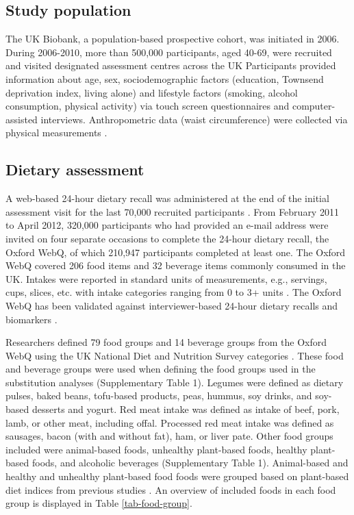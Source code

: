 \documentclass[sn-basic,Numbered,iicol,pdflatex]{sn-jnl}
\begin{document}
\hypertarget{subsec1}{%
\subsection{Study population}\label{subsec1}}

The UK Biobank, a population-based prospective cohort, was initiated in
2006. \citep{sudlow2015} During 2006-2010, more than 500,000 participants,
aged 40-69, were recruited and visited designated assessment centres
across the UK Participants provided information about age, sex,
sociodemographic factors (education, Townsend deprivation index, living
alone) and lifestyle factors (smoking, alcohol consumption, physical
activity) via touch screen questionnaires and computer-assisted
interviews. Anthropometric data (waist circumference) were collected via
physical measurements \citep{RN113}.

\hypertarget{subsec2}{%
\subsection{Dietary assessment}\label{subsec2}}

A web-based 24-hour dietary recall was administered at the end of the
initial assessment visit for the last 70,000 recruited participants
\citep{RN115}. From February 2011 to April 2012, 320,000 participants who had
provided an e-mail address were invited on four separate occasions to
complete the 24-hour dietary recall, the Oxford WebQ, of which 210,947
participants completed at least one. The Oxford WebQ covered 206 food
items and 32 beverage items commonly consumed in the UK. Intakes were
reported in standard units of measurements, e.g., servings, cups,
slices, etc. with intake categories ranging from 0 to 3+ units
\citep{piernas2021}. The Oxford WebQ has been validated against
interviewer-based 24-hour dietary recalls and biomarkers \citep{Liu2011, Greenwood2019}.

Researchers defined 79 food groups and 14 beverage groups from the
Oxford WebQ using the UK National Diet and Nutrition Survey categories
\citep{piernas2021}. These food and beverage groups were used when defining
the food groups used in the substitution analyses (Supplementary Table
1). Legumes were defined as dietary pulses, baked beans, tofu-based
products, peas, hummus, soy drinks, and soy-based desserts and yogurt.
Red meat intake was defined as intake of beef, pork, lamb, or other
meat, including offal. Processed red meat intake was defined as
sausages, bacon (with and without fat), ham, or liver pate. Other food
groups included were animal-based foods, unhealthy plant-based foods,
healthy plant-based foods, and alcoholic beverages (Supplementary Table
1). Animal-based and healthy and unhealthy plant-based food foods were
grouped based on plant-based diet indices from previous studies
\citep{Thompson2023, Heianza2021, Satija2017, Satija2016}. An overview of
included foods in each food group is displayed in Table
\ref{tab-food-group}.
\end{document}

